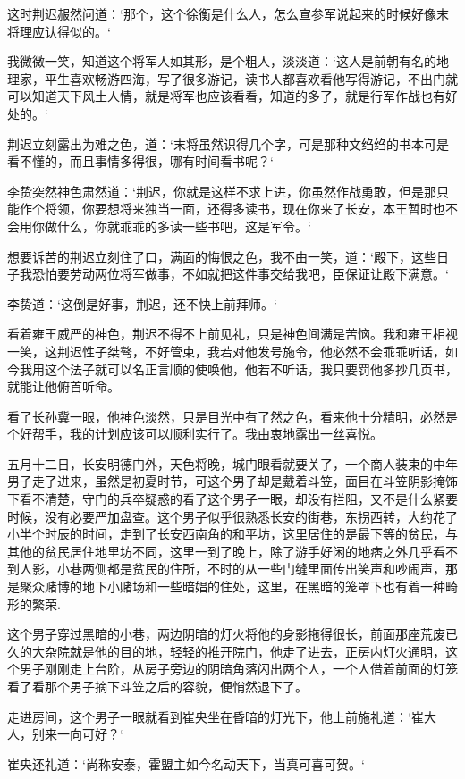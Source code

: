 这时荆迟赧然问道：‘那个，这个徐衡是什么人，怎么宣参军说起来的时候好像末将理应认得似的。‘

我微微一笑，知道这个将军人如其形，是个粗人，淡淡道：‘这人是前朝有名的地理家，平生喜欢畅游四海，写了很多游记，读书人都喜欢看他写得游记，不出门就可以知道天下风土人情，就是将军也应该看看，知道的多了，就是行军作战也有好处的。‘

荆迟立刻露出为难之色，道：‘末将虽然识得几个字，可是那种文绉绉的书本可是看不懂的，而且事情多得很，哪有时间看书呢？‘

李贽突然神色肃然道：‘荆迟，你就是这样不求上进，你虽然作战勇敢，但是那只能作个将领，你要想将来独当一面，还得多读书，现在你来了长安，本王暂时也不会用你做什么，你就乖乖的多读一些书吧，这是军令。‘

想要诉苦的荆迟立刻住了口，满面的悔恨之色，我不由一笑，道：‘殿下，这些日子我恐怕要劳动两位将军做事，不如就把这件事交给我吧，臣保证让殿下满意。‘

李贽道：‘这倒是好事，荆迟，还不快上前拜师。‘

看着雍王威严的神色，荆迟不得不上前见礼，只是神色间满是苦恼。我和雍王相视一笑，这荆迟性子桀骜，不好管束，我若对他发号施令，他必然不会乖乖听话，如今我用这个法子就可以名正言顺的使唤他，他若不听话，我只要罚他多抄几页书，就能让他俯首听命。

看了长孙冀一眼，他神色淡然，只是目光中有了然之色，看来他十分精明，必然是个好帮手，我的计划应该可以顺利实行了。我由衷地露出一丝喜悦。

五月十二日，长安明德门外，天色将晚，城门眼看就要关了，一个商人装束的中年男子走了进来，虽然是初夏时节，可这个男子却是戴着斗笠，面目在斗笠阴影掩饰下看不清楚，守门的兵卒疑惑的看了这个男子一眼，却没有拦阻，又不是什么紧要时候，没有必要严加盘查。这个男子似乎很熟悉长安的街巷，东拐西转，大约花了小半个时辰的时间，走到了长安西南角的和平坊，这里居住的是最下等的贫民，与其他的贫民居住地里坊不同，这里一到了晚上，除了游手好闲的地痞之外几乎看不到人影，小巷两侧都是贫民的住所，不时的从一些门缝里面传出笑声和吵闹声，那是聚众赌博的地下小赌场和一些暗娼的住处，这里，在黑暗的笼罩下也有着一种畸形的繁荣.

这个男子穿过黑暗的小巷，两边阴暗的灯火将他的身影拖得很长，前面那座荒废已久的大杂院就是他的目的地，轻轻的推开院门，他走了进去，正房内灯火通明，这个男子刚刚走上台阶，从房子旁边的阴暗角落闪出两个人，一个人借着前面的灯笼看了看那个男子摘下斗笠之后的容貌，便悄然退下了。

走进房间，这个男子一眼就看到崔央坐在昏暗的灯光下，他上前施礼道：‘崔大人，别来一向可好？‘

崔央还礼道：‘尚称安泰，霍盟主如今名动天下，当真可喜可贺。‘

